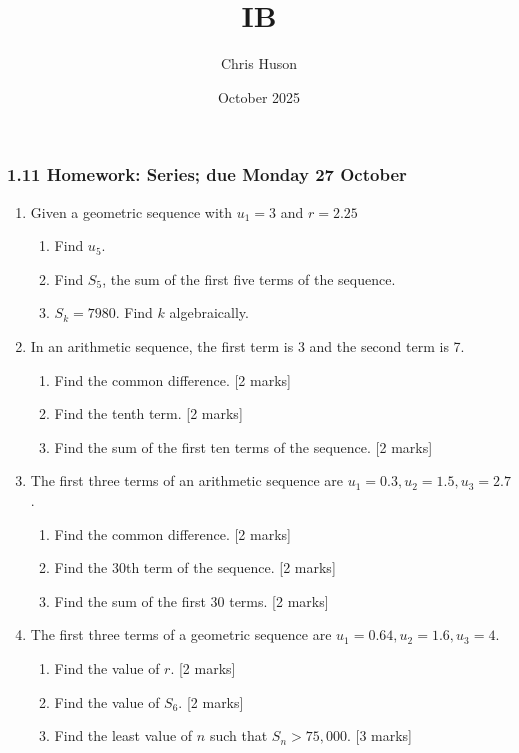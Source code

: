 \documentclass[12pt, twoside]{article}
\title{IB}
\author{Chris Huson}
\date{October 2025}
\begin{document}
\subsubsection*{1.11 Homework: Series; due Monday 27 October}
\begin{enumerate}[itemsep=0.5cm]

\item Given a geometric sequence with $u_1=3$ and $r=2.25$
  \begin{enumerate}
      \item Find $u_5$.
      \item Find $S_5$, the sum of the first five terms of the sequence.
      \item $S_k=7980$. Find $k$ algebraically.
  \end{enumerate}

\item In an arithmetic sequence, the first term is 3 and the second term is 7.
    \begin{enumerate}
        \item Find the common difference. \hfill [2 marks]
        \item Find the tenth term. \hfill [2 marks]
        \item Find the sum of the first ten terms of the sequence. \hfill [2 marks]
    \end{enumerate}

\item The first three terms of an arithmetic sequence are $u_1 = 0.3, u_2 = 1.5, u_3 = 2.7$.
    \begin{enumerate}
        \item Find the common difference. \hfill [2 marks]
        \item Find the 30th term of the sequence. \hfill [2 marks]
        \item Find the sum of the first 30 terms. \hfill [2 marks]
    \end{enumerate}

\item The first three terms of a geometric sequence are $u_1 = 0.64, u_2 = 1.6, u_3 = 4$.
    \begin{enumerate}
        \item Find the value of $r$. \hfill [2 marks]
        \item Find the value of $S_6$. \hfill [2 marks]
        \item Find the least value of $n$ such that $S_n > 75,000$. \hfill [3 marks]
    \end{enumerate}


\end{enumerate}
\end{document}

